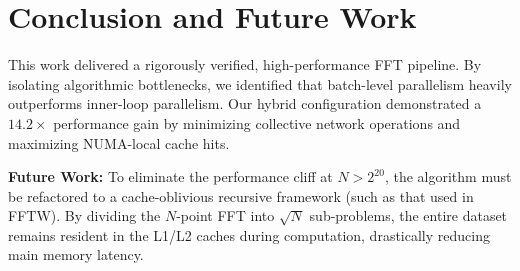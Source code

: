 \documentclass[journal]{IEEEtran}
\begin{document}
\section{Conclusion and Future Work}
This work delivered a rigorously verified, high-performance FFT pipeline. By isolating algorithmic bottlenecks, we identified that batch-level parallelism heavily outperforms inner-loop parallelism. Our hybrid configuration demonstrated a $14.2\times$ performance gain by minimizing collective network operations and maximizing NUMA-local cache hits.

\textbf{Future Work:} To eliminate the performance cliff at $N>2^{20}$, the algorithm must be refactored to a cache-oblivious recursive framework (such as that used in FFTW). By dividing the $N$-point FFT into $\sqrt{N}$ sub-problems, the entire dataset remains resident in the L1/L2 caches during computation, drastically reducing main memory latency.



\end{document}
